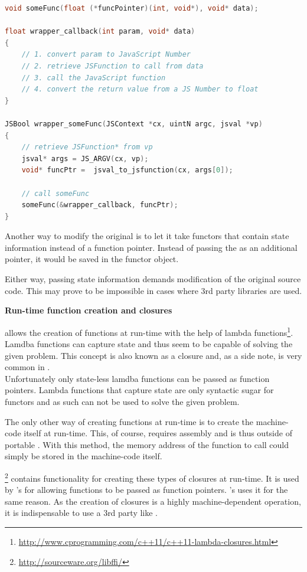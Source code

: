 \SingleSpacing
\begin{lstlisting}[language=C++, caption=Wrapper code for handling methods that take function pointers \#2]
void someFunc(float (*funcPointer)(int, void*), void* data);

float wrapper_callback(int param, void* data)
{
	// 1. convert param to JavaScript Number
	// 2. retrieve JSFunction to call from data
	// 3. call the JavaScript function
	// 4. convert the return value from a JS Number to float
}

JSBool wrapper_someFunc(JSContext *cx, uintN argc, jsval *vp)
{
	// retrieve JSFunction* from vp
	jsval* args = JS_ARGV(cx, vp);
	void* funcPtr =  jsval_to_jsfunction(cx, args[0]);
	
	// call someFunc
	someFunc(&wrapper_callback, funcPtr);
}
\end{lstlisting}
\OnehalfSpacing

Another way to modify the original  is to let it take functors that contain state information instead of a function pointer. Instead of passing the  as an additional  pointer, it would be saved in the functor object.

Either way, passing state information demands modification of the original source code. This may prove to be impossible in cases where 3rd party libraries are used.

\textbf{Run-time function creation and closures}

 allows the creation of functions at run-time with the help of lambda functions\footnote{\url{http://www.cprogramming.com/c++11/c++11-lambda-closures.html}}. Lamdba functions can capture state and thus seem to be capable of solving the given problem. This concept is also known as a closure and, as a side note, is very common in .
\\Unfortunately only state-less lamdba functions can be passed as function pointers. Lambda functions that capture state are only syntactic sugar for functors and as such can not be used to solve the given problem.

The only other way of creating functions at run-time is to create the machine-code itself at run-time. This, of course, requires assembly and is thus outside of portable . With this method, the memory address of the  function to call could simply be stored in the machine-code itself.

\footnote{\url{http://sourceware.org/libffi/}} contains functionality for creating these types of closures at run-time. It is used by 's  for allowing  functions to be passed as  function pointers. 's  uses it for the same reason. As the creation of closures is a highly machine-dependent operation, it is indispensable to use a 3rd party like .

